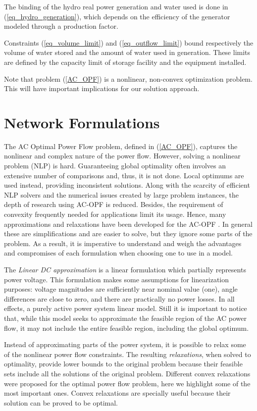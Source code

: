 \documentclass{juliacon}
\begin{document}
The binding of the hydro real power generation and water used is done in (\ref{eq_hydro_generation}), which depends on the efficiency of the generator modeled through a production factor.

Constraints (\ref{eq_volume_limit}) and (\ref{eq_outflow_limit}) bound respectively the volume of water stored and the amount of water used in generation. These limits are defined by the capacity limit of storage facility and the equipment installed.

Note that problem (\ref{AC_OPF}) is a nonlinear, non-convex optimization problem. This will have important implications for our solution approach.

\section{Network Formulations}
\label{sec:powermodels}

The AC Optimal Power Flow problem, defined in (\ref{AC_OPF}), captures the nonlinear and complex nature of the power flow. However, solving a nonlinear problem (NLP) is hard. Guaranteeing global optimality often involves an extensive number of comparisons and, thus, it is not done. Local optimums are used instead, providing inconsistent solutions. Along with the scarcity of efficient NLP solvers and the numerical issues created by large problem instances, the depth of research using AC-OPF is reduced. Besides, the requirement of convexity frequently needed for applications limit its usage. 
Hence, many approximations and relaxations have been developed for the AC-OPF \cite{molzahn2019survey}. In general these are simplifications and are easier to solve, but they ignore some parts of the problem. As a result, it is imperative to understand and weigh the advantages and compromises of each formulation when choosing one to use in a model.

The \textit{Linear DC approximation} is a linear formulation which partially represents power voltage. This formulation makes some assumptions for linearization purposes: voltage magnitudes are sufficiently near nominal value (one), angle differences are close to zero, and there are practically no power losses. In all effects, a purely active power system linear model. Still it is important to notice that, while this model seeks to approximate the feasible region of the AC power flow, it may not include the entire feasible region, including the global optimum. 

Instead of approximating parts of the power system, it is possible to relax some of the nonlinear power flow constraints. The resulting \textit{relaxations}, when solved to optimality, provide lower bounds to the original problem because their feasible sets include all the solutions of the original problem. Different convex relaxations were proposed for the optimal power flow problem, here we highlight some of the most important ones. Convex relaxations are specially useful because their solution can be proved to be optimal.
\end{document}
